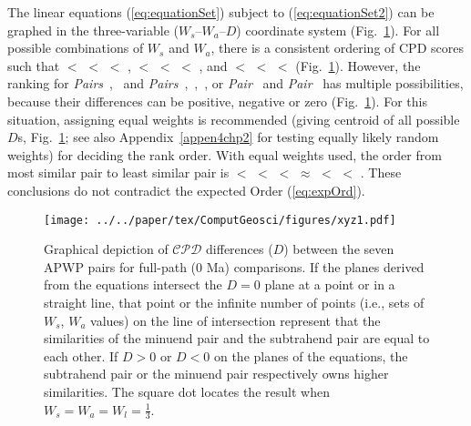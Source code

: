 The linear equations (\ref{eq:equationSet}) subject to (\ref{eq:equationSet2})
can be graphed in the three-variable ($W_s\textrm{--}W_a\textrm{--}D$)
coordinate system (Fig.~\ref{fig:pair-cmp}). For all possible combinations of
$W_s$ and $W_a$, there is a consistent ordering of CPD scores such that
\textbf{} $<$ \textbf{} $<$
\textbf{} $<$ \textbf{},
\textbf{} $<$ \textbf{} $<$
\textbf{} $<$ \textbf{}, and
\textbf{} $<$ \textbf{} $<$
\textbf{} $<$ \textbf{}
(Fig.~\ref{fig:pair-cmp}). However, the ranking for
\emph{Pairs}~\textbf{},~\textbf{} and
\emph{Pairs}~\textbf{},~\textbf{},~\textbf{},
or \emph{Pair}~\textbf{} and
\emph{Pair}~\textbf{} has multiple possibilities, because
their differences can be positive, negative or zero (Fig.~\ref{fig:pair-cmp}).
For this situation, assigning equal weights is recommended (giving centroid of
all possible $D$s, Fig.~\ref{fig:pair-cmp}; see also Appendix~\ref{appen4chp2}
for testing equally likely random weights) for deciding the rank order. With
equal weights used, the order from most similar pair to least similar pair is
\textbf{} $<$ \textbf{} $<$
\textbf{} $<$ \textbf{} $\approx$
\textbf{} $<$ \textbf{} $<$
\textbf{}.
These conclusions do not contradict the expected Order (\ref{eq:expOrd}).

\begin{figure}[tbp]
\texttt{[image: ../../paper/tex/ComputGeosci/figures/xyz1.pdf]}
\caption[Criteria of pair comparisons]{Graphical depiction of $\mathcal{CPD}$
differences ($D$) between the seven APWP pairs for full-path (0
Ma) comparisons. If the planes derived from the equations intersect the $D=0$
plane at a point or in a straight line, that point or the infinite number of
points (i.e., sets of $W_s$, $W_a$ values) on the line of intersection represent
that the similarities of the minuend pair and the subtrahend pair are equal to
each other. If $D>0$ or $D<0$ on the planes of the equations, the subtrahend
pair or the minuend pair respectively owns higher similarities. The square dot
locates the result when $W_s=W_a=W_l=\frac{1}{3}$.}\label{fig:pair-cmp}
\end{figure}

